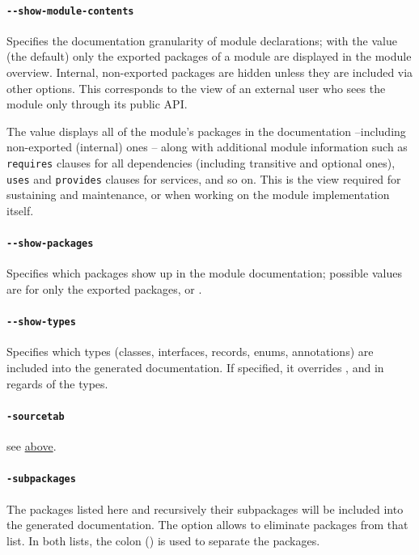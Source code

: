 \paragraph{\texttt{-{}-show-module-contents}} Specifies the documentation granularity of module declarations; with the value  (the default) only the exported packages of a module are displayed in the module overview. Internal, non-exported packages are hidden unless they are included via other options. This corresponds to the view of an external user who sees the module only through its public API.

The value  displays all of the module's packages in the documentation –including non-exported (internal) ones – along with additional module information such as \texttt{requires} clauses for all dependencies (including transitive and optional ones), \texttt{uses} and \texttt{provides} clauses for services, and so on. This is the view required for sustaining and maintenance, or when working on the module implementation itself.

\paragraph{\texttt{-{}-show-packages}} Specifies which packages show up in the module documentation; possible values are  for only the exported packages, or .

\paragraph{\texttt{-{}-show-types}} Specifies which types (classes, interfaces, records, enums, annotations) are included into the generated documentation. If specified, it overrides \mbox{}, \mbox{} and \mbox{} in regards of the types.

\paragraph{\texttt{-sourcetab}} see  \hyperref[par:linksource]{above}.

\paragraph{\texttt{-subpackages}} The packages listed here and recursively their subpackages will be included into the generated documentation. The option  allows to eliminate packages from that list. In both lists, the colon (\bdq{:}) is used to separate the packages.


